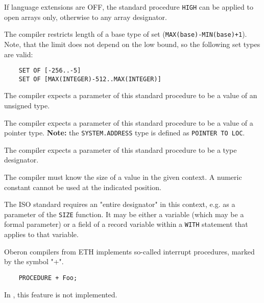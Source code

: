 If language extensions are OFF, the standard procedure \verb'HIGH'
can be applied to open arrays only, otherwise to any array designator.


The compiler restricts length of a base type of set
(\verb'MAX(base)-MIN(base)+1'). Note, that the limit does not depend on the low
bound, so the following set types are valid:

\verb'    SET OF [-256..-5]'\\
\verb'    SET OF [MAX(INTEGER)-512..MAX(INTEGER)]'


The compiler expects a parameter of this standard procedure to
be a value of an unsigned type.


The compiler expects a parameter of this standard procedure to be a
value of a pointer type. {\bf Note:} the \verb'SYSTEM.ADDRESS' type is defined as
\verb'POINTER TO LOC'.


The compiler expects a parameter of this standard procedure to be a
type designator.


The compiler must know the size of a value in the given context. A numeric
constant cannot be used at the indicated position.


The ISO standard requires an "entire designator" in this context, e.g.  as
a parameter of the \verb'SIZE' function. It may be either a variable (which
may be a formal parameter) or a field of a record variable within a
\verb'WITH' statement that applies to that variable.


Oberon compilers from ETH implements so-called interrupt procedures,
marked by the symbol "+".

\verb'    PROCEDURE + Foo;'

In \XDS{}, this feature is not implemented.



